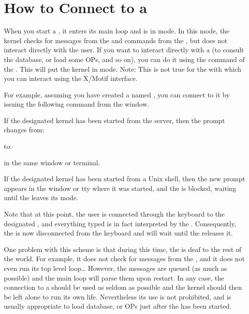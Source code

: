 \section{How to Connect to a \CPK{}}

When you start a \CPK{}, it enters its main loop and is in  mode. In
this mode, the kernel checks for messages from the \MPA{} and commands from the
\OPRSS{}, but does not interact directly with the user. If you want to
interact directly with a \CPK{} (to consult the database, or load some OPs, and
so on), you can do it using the  command of the \OPRSS{}. This
will put the kernel in  mode. Note: This is not true for the \XPK{}
with which you can interact using the X/Motif interface.

For example, assuming you have created a \CPK{} named , you can
connect to it by issuing the following command from the \OPRSS{} window.


If the designated kernel has been started from the server, then the prompt
changes from:


to:


in the same window or terminal.

If the designated kernel has been started from a Unix shell, then the new prompt
appears in the window or tty where it was started, and the \OPRSS{} is
blocked, waiting until the \CPK{} leaves its  mode.

Note that at this point, the user is connected through the keyboard to the
designated \CPK{}, and everything typed is in fact interpreted by
the \CPK{}. Consequently, the \OPRSS{} is now disconnected from
the keyboard and will wait until the \CPK{} releases it.

One problem with this scheme is that during this time, the \CPK{} is deaf to
the rest of the world. For example, it does not check for messages from the
\MPA{}, and it does not even run its top level loop\dots{} However, the messages
are queued (as much as possible) and the main loop will parse them upon
restart.  In any case, the connection to a \CPK{} should be used as seldom as
possible and the kernel should then be left alone to run its own life.
Nevertheless its use is not prohibited, and is usually appropriate to load
database, or OPs just after the \CPK{} has been started.

